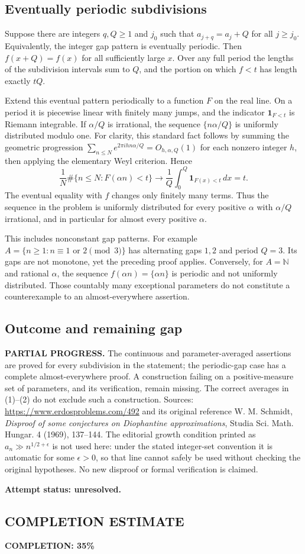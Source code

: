 \subsection*{Eventually periodic subdivisions}
Suppose there are integers $q,Q\ge1$ and $j_0$ such that $a_{j+q}=a_j+Q$ for all $j\ge j_0$. Equivalently, the integer gap pattern is eventually periodic. Then $f(x+Q)=f(x)$ for all sufficiently large $x$. Over any full period the lengths of the subdivision intervals sum to $Q$, and the portion on which $f<t$ has length exactly $tQ$.

Extend this eventual pattern periodically to a function $F$ on the real line. On a period it is piecewise linear with finitely many jumps, and the indicator $\mathbf1_{F<t}$ is Riemann integrable. If $\alpha/Q$ is irrational, the sequence $\{n\alpha/Q\}$ is uniformly distributed modulo one. For clarity, this standard fact follows by summing the geometric progression $\sum_{n\le N}e^{2\pi ihn\alpha/Q}=O_{h,\alpha,Q}(1)$ for each nonzero integer $h$, then applying the elementary Weyl criterion. Hence
\[\frac1N\#\{n\le N:F(\alpha n)<t\}\longrightarrow
\frac1Q\int_0^Q\mathbf1_{F(x)<t}\,dx=t.
\]
The eventual equality with $f$ changes only finitely many terms. Thus the sequence in the problem is uniformly distributed for every positive $\alpha$ with $\alpha/Q$ irrational, and in particular for almost every positive $\alpha$.

This includes nonconstant gap patterns. For example $A=\{n\ge1:n\equiv1\text{ or }2\pmod3\}$ has alternating gaps $1,2$ and period $Q=3$. Its gaps are not monotone, yet the preceding proof applies. Conversely, for $A=\mathbb N$ and rational $\alpha$, the sequence $f(\alpha n)=\{\alpha n\}$ is periodic and not uniformly distributed. Those countably many exceptional parameters do not constitute a counterexample to an almost-everywhere assertion.

\subsection*{Outcome and remaining gap}
\textbf{PARTIAL PROGRESS.} The continuous and parameter-averaged assertions are proved for every subdivision in the statement; the periodic-gap case has a complete almost-everywhere proof. A construction failing on a positive-measure set of parameters, and its verification, remain missing. The correct averages in (1)--(2) do not exclude such a construction.
Sources: \url{https://www.erdosproblems.com/492} and its original reference W. M. Schmidt, \emph{Disproof of some conjectures on Diophantine approximations}, Studia Sci. Math. Hungar. 4 (1969), 137--144. The editorial growth condition printed as $a_n\gg n^{1/2+\epsilon}$ is not used here: under the stated integer-set convention it is automatic for some $\epsilon>0$, so that line cannot safely be used without checking the original hypotheses. No new disproof or formal verification is claimed.

\textbf{Attempt status: unresolved.}

\subsection*{COMPLETION ESTIMATE}
\textbf{COMPLETION: 35\%}
